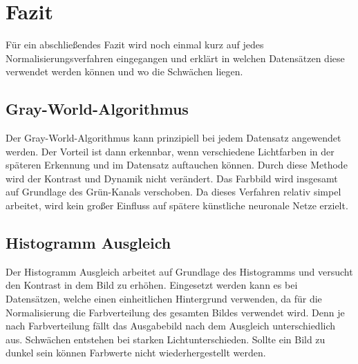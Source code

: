 \chapter{Fazit}\label{s.fazit}
Für ein abschließendes Fazit wird noch einmal kurz auf jedes Normalisierungsverfahren eingegangen und erklärt in welchen Datensätzen diese verwendet werden können und wo die Schwächen liegen.
\section{Gray-World-Algorithmus}
Der Gray-World-Algorithmus kann prinzipiell bei jedem Datensatz angewendet werden. Der Vorteil ist dann erkennbar, wenn verschiedene Lichtfarben in der späteren Erkennung und im Datensatz auftauchen können. Durch diese Methode wird der Kontrast und Dynamik nicht verändert. Das Farbbild wird insgesamt auf Grundlage des Grün-Kanals verschoben. Da dieses Verfahren relativ simpel arbeitet, wird kein großer Einfluss auf spätere künstliche neuronale Netze erzielt.
\section{Histogramm Ausgleich}
Der Histogramm Ausgleich arbeitet auf Grundlage des Histogramms und versucht den Kontrast in dem Bild zu erhöhen. Eingesetzt werden kann es bei Datensätzen, welche einen einheitlichen Hintergrund verwenden, da für die Normalisierung die Farbverteilung des gesamten Bildes verwendet wird. Denn je nach Farbverteilung fällt das Ausgabebild nach dem Ausgleich unterschiedlich aus. Schwächen entstehen bei starken Lichtunterschieden. Sollte ein Bild zu dunkel sein können Farbwerte nicht wiederhergestellt werden.
